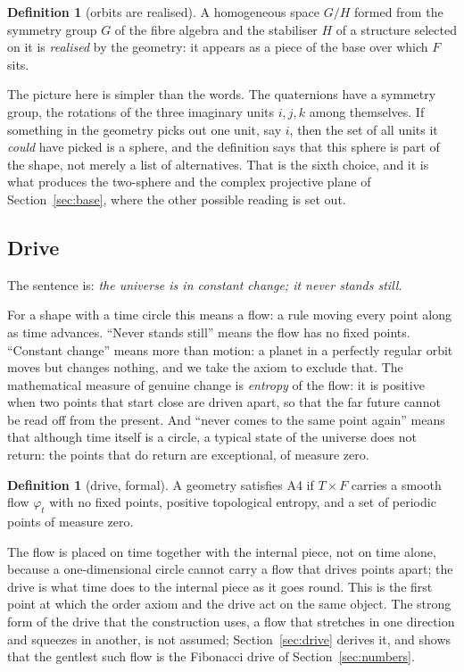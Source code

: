 \documentclass[11pt,a4paper]{article}
\theoremstyle{plain}
\theoremstyle{definition}
\newtheorem{definition}[theorem]{Definition}
\theoremstyle{remark}
\begin{document}
\begin{definition}[orbits are realised]\label{def:orbits}
A homogeneous space $G/H$ formed from the symmetry group $G$ of the fibre algebra and the stabiliser $H$ of a structure selected on it is \emph{realised} by the geometry: it appears as a piece of the base over which $F$ sits.
\end{definition}

The picture here is simpler than the words. The quaternions have a symmetry group, the rotations of the three imaginary units $i,j,k$ among themselves. If something in the geometry picks out one unit, say $i$, then the set of all units it \emph{could} have picked is a sphere, and the definition says that this sphere is part of the shape, not merely a list of alternatives. That is the sixth choice, and it is what produces the two-sphere and the complex projective plane of Section~\ref{sec:base}, where the other possible reading is set out.

\subsection{Drive}\label{sec:A4}

The sentence is: \emph{the universe is in constant change; it never stands still}.

For a shape with a time circle this means a flow: a rule moving every point along as time advances. ``Never stands still'' means the flow has no fixed points. ``Constant change'' means more than motion: a planet in a perfectly regular orbit moves but changes nothing, and we take the axiom to exclude that. The mathematical measure of genuine change is \emph{entropy} of the flow: it is positive when two points that start close are driven apart, so that the far future cannot be read off from the present. And ``never comes to the same point again'' means that although time itself is a circle, a typical state of the universe does not return: the points that do return are exceptional, of measure zero.

\begin{definition}[drive, formal]\label{def:A4}
A geometry satisfies A4 if $T\times F$ carries a smooth flow $\varphi_{t}$ with no fixed points, positive topological entropy, and a set of periodic points of measure zero.
\end{definition}

The flow is placed on time together with the internal piece, not on time alone, because a one-dimensional circle cannot carry a flow that drives points apart; the drive is what time does to the internal piece as it goes round. This is the first point at which the order axiom and the drive act on the same object. The strong form of the drive that the construction uses, a flow that stretches in one direction and squeezes in another, is not assumed; Section~\ref{sec:drive} derives it, and shows that the gentlest such flow is the Fibonacci drive of Section~\ref{sec:numbers}.
\end{document}
